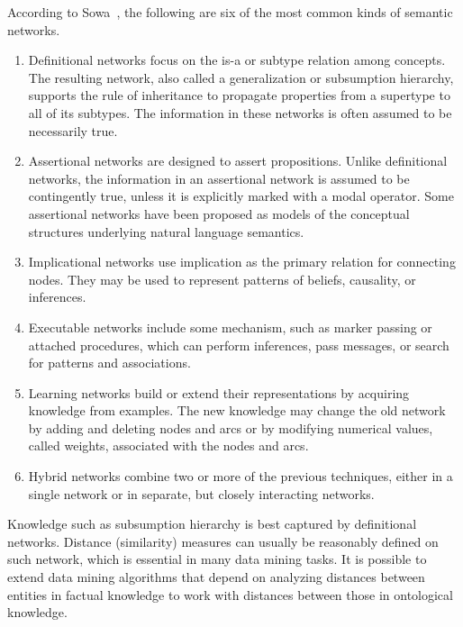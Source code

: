 According to Sowa~\cite{Sowa91principlesof}, the following are six of the most common kinds of semantic networks.
\begin{enumerate}
\item Definitional networks focus on the is-a or subtype relation among concepts. The resulting network, also called a generalization or subsumption hierarchy, supports the rule of inheritance to propagate properties from a supertype to all of its subtypes. The information in these networks is often assumed to be necessarily true.

\item Assertional networks are designed to assert propositions. Unlike definitional networks, the information in an assertional network is assumed to be contingently true, unless it is explicitly marked with a modal operator. Some assertional networks have been proposed as models of the conceptual structures underlying natural language semantics.

\item Implicational networks use implication as the primary relation for connecting nodes. They may be used to represent patterns of beliefs, causality, or inferences.

\item Executable networks include some mechanism, such as marker passing or attached procedures, which can perform inferences, pass messages, or search for patterns and associations.

\item Learning networks build or extend their representations by acquiring knowledge from examples. The new knowledge may change the old network by adding and deleting nodes and arcs or by modifying numerical values, called weights, associated with the nodes and arcs.

\item Hybrid networks combine two or more of the previous techniques, either in a single network or in separate, but closely interacting networks.
\end{enumerate}

Knowledge such as subsumption hierarchy is best captured by definitional networks. Distance (similarity) measures can usually be reasonably defined on such network, which is essential in many data mining tasks. It is possible to extend data mining algorithms that depend on analyzing distances between entities in factual knowledge to work with distances between those in ontological knowledge.


